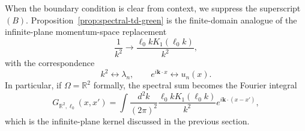 \documentclass[nopacs,amsmath,amsfonts,amssymb,aps,superscriptaddress]{revtex4}
\begin{document}
When the boundary condition is clear from context, we suppress the superscript $(B)$. Proposition~\ref{prop:spectral-td-green} is the finite-domain analogue of the infinite-plane momentum-space replacement
\begin{equation}
  \frac{1}{k^2}\longrightarrow\frac{\ell_0 kK_1(\ell_0 k)}{k^2},
\end{equation}
with the correspondence
\begin{equation}
  k^2\longleftrightarrow\lambda_n,
  \qquad
  e^{i\mathbf k\cdot x}\longleftrightarrow u_n(x).
\end{equation}
In particular, if $\Omega=\mathbb R^2$ formally, the spectral sum becomes the Fourier integral
\begin{equation}
  G_{\mathbb R^2,\ell_0}(x,x')
  =\int\frac{d^2k}{(2\pi)^2}
  \frac{\ell_0 kK_1(\ell_0k)}{k^2}
  e^{i\mathbf k\cdot(x-x')},
\end{equation}
which is the infinite-plane kernel discussed in the previous section.
\end{document}
